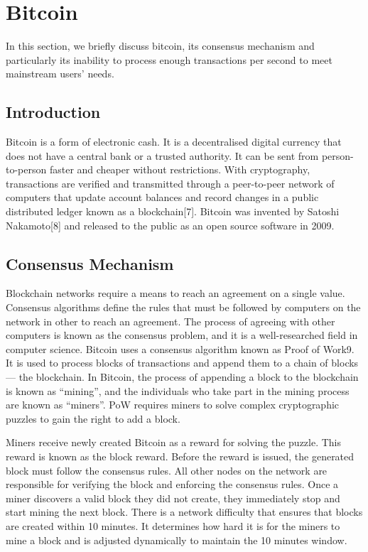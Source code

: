 \section{Bitcoin}
In this section, we briefly discuss bitcoin, its consensus mechanism and particularly its inability to process enough transactions per second to meet mainstream users’ needs.


\subsection{Introduction}
Bitcoin is a form of electronic cash. It is a decentralised digital currency that does not have a central bank or a trusted authority. It can be sent from person-to-person faster and cheaper without restrictions. With cryptography, transactions are verified and transmitted through a peer-to-peer network of computers that update account balances and record changes in a public distributed ledger known as a blockchain[7]. Bitcoin was invented by Satoshi Nakamoto[8] and released to the public as an open source software in 2009.

\subsection{Consensus Mechanism}
Blockchain networks require a means to reach an agreement on a single value. Consensus algorithms define the rules that must be followed by computers on the network in other to reach an agreement. The process of agreeing with other computers is known as the consensus problem, and it is a well-researched field in computer science. Bitcoin uses a consensus algorithm known as Proof of Work9. It is used to process blocks of transactions and append them to a chain of blocks — the blockchain. In Bitcoin, the process of appending a block to the blockchain is known as “mining”, and the individuals who take part in the mining process are known as “miners”. PoW requires miners to solve complex cryptographic puzzles to gain the right to add a block.

Miners receive newly created Bitcoin as a reward for solving the puzzle. This reward is known as the block reward. Before the reward is issued, the generated block must follow the consensus rules. All other nodes on the network are responsible for verifying the block and enforcing the consensus rules. Once a miner discovers a valid block they did not create, they immediately stop and start mining the next block. There is a network difficulty that ensures that blocks are created within 10 minutes. It determines how hard it is for the miners to mine a block and is adjusted dynamically to maintain the 10 minutes window.

